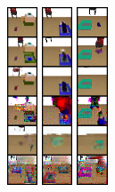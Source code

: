 \begin{figure}[t]
\begin{subfigure}[b]{0.3\textwidth}
{                 { \includegraphics[width=0.1\textwidth]{val/imgs/samples/sim1/s5.png} } \hspace{-12px}
                 { \includegraphics[width=0.1\textwidth]{val/imgs/samples/sim1/f1.png} } \hspace{-12px}
                 { \includegraphics[width=0.1\textwidth]{val/imgs/samples/sim1/f2.png} } \hspace{-12px}
}
\end{subfigure}
\end{figure}
